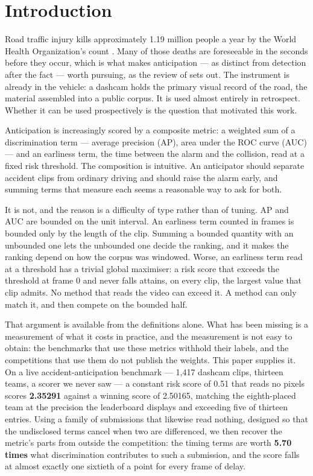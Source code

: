 \section{Introduction}

Road traffic injury kills approximately 1.19 million people a year by the World Health Organization's count \citep{who2023}. Many of those deaths are foreseeable in the seconds before they occur, which is what makes anticipation --- as distinct from detection after the fact --- worth pursuing, as the review of \citet{zhang2025review} sets out. The instrument is already in the vehicle: a dashcam holds the primary visual record of the road, the material \citet{moura2025nexar} assembled into a public corpus. It is used almost entirely in retrospect. Whether it can be used prospectively is the question that motivated this work.

Anticipation is increasingly scored by a composite metric: a weighted sum of a discrimination term --- average precision (AP), area under the ROC curve (AUC) --- and an earliness term, the time between the alarm and the collision, read at a fixed risk threshold. The composition is intuitive. An anticipator should separate accident clips from ordinary driving and should raise the alarm early, and summing terms that measure each seems a reasonable way to ask for both.

It is not, and the reason is a difficulty of type rather than of tuning. AP and AUC are bounded on the unit interval. An earliness term counted in frames is bounded only by the length of the clip. Summing a bounded quantity with an unbounded one lets the unbounded one decide the ranking, and it makes the ranking depend on how the corpus was windowed. Worse, an earliness term read at a threshold has a trivial global maximiser: a risk score that exceeds the threshold at frame 0 and never falls attains, on every clip, the largest value that clip admits. No method that reads the video can exceed it. A method can only match it, and then compete on the bounded half.

That argument is available from the definitions alone. What has been missing is a measurement of what it costs in practice, and the measurement is not easy to obtain: the benchmarks that use these metrics withhold their labels, and the competitions that use them do not publish the weights. This paper supplies it. On a live accident-anticipation benchmark --- 1,417 dashcam clips, thirteen teams, a scorer we never saw --- a constant risk score of 0.51 that reads no pixels scores \textbf{2.35291} against a winning score of 2.50165, matching the eighth-placed team at the precision the leaderboard displays and exceeding five of thirteen entries. Using a family of submissions that likewise read nothing, designed so that the undisclosed terms cancel when two are differenced, we then recover the metric's parts from outside the competition: the timing terms are worth \textbf{5.70 times} what discrimination contributes to such a submission, and the score falls at almost exactly one sixtieth of a point for every frame of delay.

